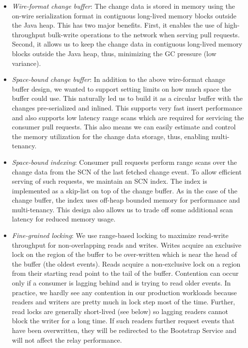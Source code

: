 \begin{itemize}

\item \emph{Wire-format change buffer}: The change data is stored in memory using the on-wire serialization format in contiguous long-lived memory blocks outside the Java heap. This has two major benefits. First, it enables the use of high-throughput bulk-write operations to the network when serving pull requests. Second, it allows us to keep the change data in contiguous long-lived memory blocks outside the Java heap, thus, minimizing the GC pressure (low variance). 

\item \emph{Space-bound change buffer}: In addition to the above wire-format change buffer design, we wanted to support setting limits on how much space the buffer could use. This naturally led us to build it as a circular buffer with the changes pre-serialized and inlined. This supports very fast insert performance and also supports low latency range scans which are required for servicing the consumer pull requests. This also means we can easily estimate and control the memory utilization for the change data storage, thus, enabling multi-tenancy. 

\item \emph{Space-bound indexing}: Consumer pull requests perform range scans over the change data from the SCN of the last fetched change event. To allow efficient serving of such requests, we maintain an SCN index. The index is implemented as a skip-list on top of the change  buffer. As in the case of the change buffer, the index uses off-heap bounded memory for performance and multi-tenancy. This design also allows us to trade off some additional scan latency for reduced memory usage.

\item \emph{Fine-grained locking}: We use range-based locking to maximize read-write throughput for non-overlapping reads and writes. Writes acquire an exclusive lock on the region of the buffer to be over-written which is near the head of the buffer (the oldest events). Reads acquire a non-exclusive lock on a region from their starting read point to the tail of the buffer. Contention can occur only if a consumer is lagging behind and is trying to read older events. In practice, we hardly see any contention in our production workloads because readers and writers are pretty much in lock step most of the time. Further, read locks are generally short-lived (see below) so lagging readers cannot block the writer for a long time. If such readers further request events that have been  overwritten, they will be redirected to the Bootstrap Service and will not affect the relay performance.


\end{itemize}
